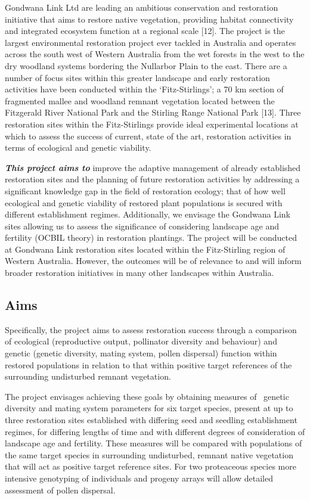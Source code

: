 \documentclass[version=last,
    paper=a4,                               %
    10pt,                                   %
    dvipsnames,
    oneside,                              %
    headings=openany,                       %
    open=any,
    BCOR=7mm,                               %
    DIV=15,     %
]{scrbook}
\begin{document}
Gondwana Link Ltd are leading an ambitious conservation and restoration
initiative that aims to restore native vegetation, providing habitat
connectivity and integrated ecosystem function at a regional scale
{[}12{]}. The project is the largest environmental restoration project
ever tackled in Australia and operates across the south west of Western
Australia from the wet forests in the west to the dry woodland systems
bordering the Nullarbor Plain to the east. There are a number of focus
sites within this greater landscape and early restoration activities
have been conducted within the `Fitz-Stirlings'; a 70 km section of
fragmented mallee and woodland remnant vegetation located between the
Fitzgerald River National Park and the Stirling Range National Park
{[}13{]}. Three restoration sites within the Fitz-Stirlings provide
ideal experimental locations at which to assess the success of current,
state of the art, restoration activities in terms of ecological and
genetic viability.

\textbf{\emph{This project aims to}} improve the adaptive management of
already established restoration sites and the planning of future
restoration activities by addressing a significant knowledge gap in the
field of restoration ecology; that of how well ecological and genetic
viability of restored plant populations is secured with different
establishment regimes. Additionally, we envisage the Gondwana Link sites
allowing us to assess the significance of considering landscape age and
fertility (OCBIL theory) in restoration plantings. The project will be
conducted at Gondwana Link restoration sites located within the
Fitz-Stirling region of Western Australia. However, the outcomes will be
of relevance to and will inform broader restoration initiatives in many
other landscapes within Australia.




\subsection*{Aims}

Specifically, the project aims to assess restoration success through a
comparison of ecological (reproductive output, pollinator diversity and
behaviour) and genetic (genetic diversity, mating system, pollen
dispersal) function within restored populations in relation to that
within positive target references of the surrounding undisturbed remnant
vegetation.

The project envisages achieving these goals by obtaining measures of~
genetic diversity and mating system parameters for six target species,
present at up to three restoration sites established with differing seed
and seedling establishment regimes, for differing lengths of time and
with different degrees of consideration of landscape age and fertility.
These measures will be compared with populations of the same target
species in surrounding undisturbed, remnant native vegetation that will
act as positive target reference sites. For two proteaceous species more
intensive genotyping of individuals and progeny arrays will allow
detailed assessment of pollen dispersal.
\end{document}
